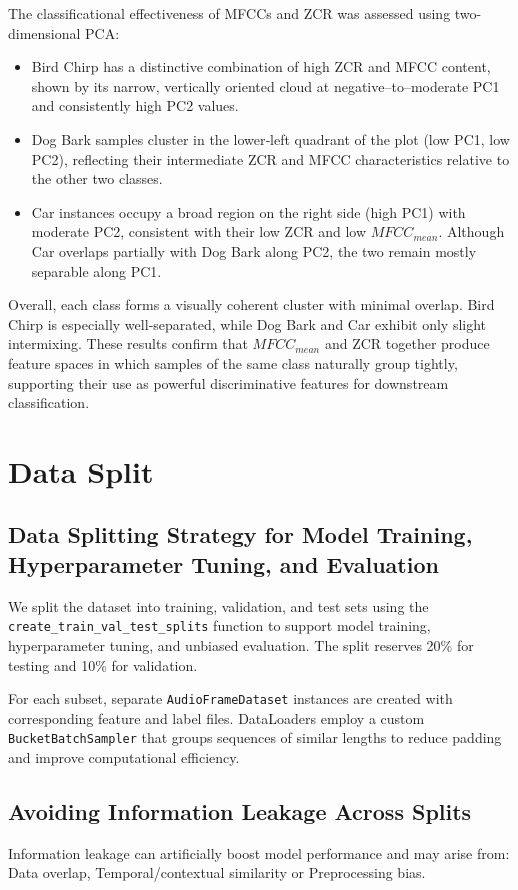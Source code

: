 \documentclass{article}
\begin{document}
The classificational effectiveness of MFCCs and ZCR was assessed using two-dimensional PCA:
\begin{itemize}
    \item Bird Chirp has a distinctive combination of high ZCR and MFCC content, shown by its narrow, vertically oriented cloud at negative–to–moderate PC1 and consistently high PC2 values. 
    \item Dog Bark samples cluster in the lower‐left quadrant of the plot (low PC1, low PC2), reflecting their intermediate ZCR and MFCC characteristics relative to the other two classes.
    \item Car instances occupy a broad region on the right side (high PC1) with moderate PC2, consistent with their low ZCR and low $MFCC_{mean}$. Although Car overlaps partially with Dog Bark along PC2, the two remain mostly separable along PC1.
\end{itemize}

Overall, each class forms a visually coherent cluster with minimal overlap. Bird Chirp is especially well‐separated, while Dog Bark and Car exhibit only slight intermixing. These results confirm that $MFCC_{mean}$ and ZCR together produce feature spaces in which samples of the same class naturally group tightly, supporting their use as powerful discriminative features for downstream classification.

\section{Data Split}
\subsection{Data Splitting Strategy for Model Training, Hyperparameter Tuning, and Evaluation}

We split the dataset into training, validation, and test sets using the \texttt{create\_train\_val\_test\_splits} function to support model training, hyperparameter tuning, and unbiased evaluation. The split reserves 20\% for testing and 10\% for validation.

For each subset, separate \texttt{AudioFrameDataset} instances are created with corresponding feature and label files. DataLoaders employ a custom \texttt{BucketBatchSampler} that groups sequences of similar lengths to reduce padding and improve computational efficiency.

\subsection{Avoiding Information Leakage Across Splits}
Information leakage can artificially boost model performance and may arise from: Data overlap, Temporal/contextual similarity or Preprocessing bias.
\end{document}
